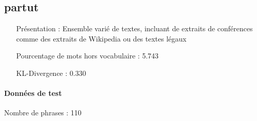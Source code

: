 \subsection{partut } 
 \begin{itemize} 
 \item[Présentation :] Ensemble varié de textes, incluant de extraits de conférences comme des extraits de Wikipedia ou des textes légaux

 \item[Pourcentage de mots hors vocabulaire : ]5.743
 \item[KL-Divergence :]0.330
 \end{itemize}  \paragraph{Données de test \\ }  
 Nombre de phrases : 110\\ 

